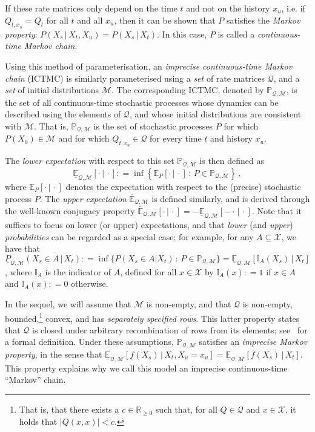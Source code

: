 \documentclass[3p]{elsarticle}
\newcommand{\reals}{\mathbb{R}}
\newcommand{\realsnonneg}{\reals_{\geq 0}}
\newcommand{\states}{\mathcal{X}}
\newcommand{\lexp}{\underline{\mathbb{E}}_{\rateset,\mathcal{M}}}
\newcommand{\uexp}{\overline{\mathbb{E}}_{\rateset,\mathcal{M}}}
\newcommand{\ind}[1]{\mathbb{I}_{#1}}
\newcommand{\rateset}{\mathcal{Q}}
\newcommand{\abs}[1]{\left\vert #1 \right\vert}
\newcommand{\coloneqq}{:\!=}
\begin{document}
If these rate matrices only depend on the time $t$ and not on the history $x_u$, i.e. if $Q_{t,x_u}=Q_t$ for all $t$ and all $x_u$, then it can be shown that $P$ satisfies the \emph{Markov property}: $P(X_s\,\vert\,X_t,X_u)=P(X_s\,\vert\,X_t)$. In this case, $P$ is called a \emph{continuous-time Markov chain}.

Using this method of parameterisation, an \emph{imprecise continuous-time Markov chain} (ICTMC) is similarly parameterised using a \emph{set} of rate matrices $\rateset$, and a \emph{set} of initial distributions $\mathcal{M}$. The corresponding ICTMC, denoted by $\mathbb{P}_{\rateset,\mathcal{M}}$, is the set of all continuous-time stochastic processes whose dynamics can be described using the elements of $\rateset$, and whose initial distributions are consistent with $\mathcal{M}$. That is, $\mathbb{P}_{\rateset,\mathcal{M}}$ is the set of stochastic processes $P$ for which $P(X_0)\in\mathcal{M}$ and for which $Q_{t,x_u}\in\rateset$ for every time $t$ and history $x_u$.

The \emph{lower expectation} with respect to this set $\mathbb{P}_{\rateset,\mathcal{M}}$ is then defined as
\begin{equation*}
\underline{\mathbb{E}}_{\rateset,\mathcal{M}}[\cdot\,\vert\,\cdot] \coloneqq \inf\left\{ \mathbb{E}_P[\cdot\,\vert\,\cdot]\,:\, P\in\mathbb{P}_{\rateset,\mathcal{M}} \right\}\,,
\end{equation*}
where $\mathbb{E}_P[\cdot\,\vert\,\cdot]$ denotes the expectation with respect to the (precise) stochastic process $P$. The \emph{upper expectation} $\uexp$ is defined similarly, and is derived through the well-known conjugacy property $\uexp[\cdot\,\vert\,\cdot] = -\lexp[-\cdot\,\vert\,\cdot]$. Note that it suffices to focus on lower (or upper) expectations, and that \emph{lower} (and \emph{upper}) \emph{probabilities} can be regarded as a special case; for example, for any $A\subseteq\states$, we have that $\underline{P}_{\rateset,\mathcal{M}}(X_s\in A\,\vert\,X_t) \coloneqq \inf\{P(X_s\in A\vert X_t)\,:\,P\in\mathbb{P}_{\rateset,\mathcal{M}}\}=\lexp[\ind{A}(X_s)\,\vert\,X_t]$, where $\ind{A}$ is the indicator of $A$, defined for all $x\in\states$ by $\ind{A}(x)\coloneqq1$ if $x\in A$ and $\ind{A}(x)\coloneqq0$ otherwise.

In the sequel, we will assume that $\mathcal{M}$ is non-empty, and that $\rateset$ is non-empty, bounded,\footnote{That is, that there exists a $c\in\realsnonneg$ such that, for all $Q\in\rateset$ and $x\in\states$, it holds that $\abs{Q(x,x)}<c$.} convex, and has \emph{separately specified rows}. This latter property states that $\rateset$ is closed under arbitrary recombination of rows from its elements; see~\citep[Definition 24]{krak2016ictmc} for a formal definition. 
Under these assumptions, $\mathbb{P}_{\rateset,\mathcal{M}}$ satisfies an \emph{imprecise Markov property}, in the sense that $\lexp[f(X_s)\,\vert\,X_t,X_u=x_u]=\lexp[f(X_s)\,\vert\,X_t]$. This property explains why we call this model an imprecise continuous-time ``Markov'' chain.
\end{document}
